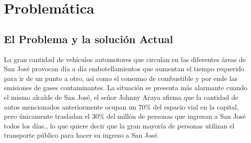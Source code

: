 \documentclass[12pt,journal,compsoc]{IEEEtran}
\begin{document}
%



\section{Problem\'{a}tica}
	\subsection{El Problema y la soluci\'{o}n Actual}
	 
		La gran cantidad de veh\'{i}culos automotores que circulan en las diferentes \'{a}reas
	de San Jos\'{e} provocan d\'{i}a a d\'{i}a embotellamientos que aumentan el tiempo requerido para ir de un punto a otro, as\'{i} como el consumo de combustible y por ende las emisiones de gases contaminantes.
	La situaci\'{o}n se presenta m\'{a}s alarmante cuando el mismo alcalde de San Jos\'{e}, el
	se\~{n}or Johnny Araya afirma que la cantidad de autos mencionados
	anteriormente ocupan un 70\% del espacio vial en la capital, pero \'{u}nicamente trasladan el 30\% del mill\'{o}n de personas que ingresan a San Jos\'{e} todos los d\'{i}as.\cite{Villegas2012}, lo que quiere decir que la gran mayoría de personas utilizan el transporte público para hacer su ingreso a San Jos\'e.
\end{document}
